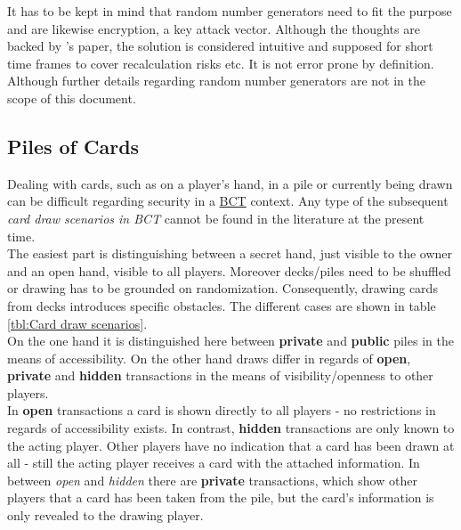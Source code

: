 It has to be kept in mind that random number generators need to fit the purpose and are likewise encryption, a key attack vector.
Although the thoughts are backed by \citet{Chatterjee.2019}'s paper, the solution is considered intuitive
and supposed for short time frames to cover recalculation risks etc.
It is not error prone by definition.
Although further details regarding random number generators are not in the scope of this document.
	
\subsection{Piles of Cards}
\label{sec:PileOfCards}
Dealing with cards, such as on a player's hand, in a pile or currently being drawn
can be difficult regarding security in a \hyperref[chap:BCT]{BCT} context. \label{lbl:CardDraw}
Any type of the subsequent \textit{card draw scenarios in \gls{BCT}} 
cannot be found in the literature at the present time. \\
The easiest part is distinguishing between a secret hand, just visible to the owner and an open hand, visible to all players.
Moreover decks/piles need to be shuffled or drawing has to be grounded on randomization.
Consequently, drawing cards from decks introduces specific obstacles.
The different cases are shown in table \ref{tbl:Card draw scenarios}. \\
On the one hand it is distinguished here between \textbf{private} and \textbf{public} piles in the means of accessibility.
On the other hand draws differ in regards of \textbf{open}, \textbf{private} and \textbf{hidden}
transactions in the means of visibility/openness to other players. \\
In \textbf{open} transactions a card is shown directly to all players - no restrictions in regards of accessibility exists.
In contrast, \textbf{hidden} transactions are only known to the acting player.
Other players have no indication that a card has been drawn at all - still the acting player receives a card with the attached information.
In between \textit{open} and \textit{hidden} there are \textbf{private} transactions,
which show other players that a card has been taken from the pile, but the card's information is only revealed to the drawing player.



